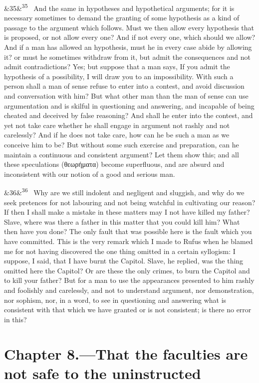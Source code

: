 \documentclass[12pt]{article}
\newcommand{\para}[1][]{\par\noindent\ifx&#1&\else\textsuperscript{\footnotesize #1}~\fi}
\begin{document}
\para[35] And the same in hypotheses and hypothetical arguments; for it is necessary sometimes to demand the granting of some hypothesis as a kind of passage to the argument which follows. Must we then allow every hypothesis that is proposed, or not allow every one? And if not every one, which should we allow? And if a man has allowed an hypothesis, must he in every case abide by allowing it? or must he sometimes withdraw from it, but admit the consequences and not admit contradictions? Yes; but suppose that a man says, If you admit the hypothesis of a possibility, I will draw you to an impossibility. With such a person shall a man of sense refuse to enter into a contest, and avoid discussion and conversation with him? But what other man than the man of sense can use argumentation and is skilful in questioning and answering, and incapable of being cheated and deceived by false reasoning? And shall he enter into the contest, and yet not take care whether he shall engage in argument not rashly and not carelessly? And if he does not take care, how can he be such a man as we conceive him to be? But without some such exercise and preparation, can he maintain a continuous and consistent argument? Let them show this; and all these speculations (θεωρήματα) become superfluous, and are absurd and inconsistent with our notion of a good and serious man.

\para[36] Why are we still indolent and negligent and sluggish, and why do we seek pretences for not labouring and not being watchful in cultivating our reason? If then I shall make a mistake in these matters may I not have killed my father? Slave, where was there a father in this matter that you could kill him? What then have you done? The only fault that was possible here is the fault which you have committed. This is the very remark which I made to Rufus when he blamed me for not having discovered the one thing omitted in a certain syllogism: I suppose, I said, that I have burnt the Capitol. Slave, he replied, was the thing omitted here the Capitol? Or are these the only crimes, to burn the Capitol and to kill your father? But for a man to use the appearances presented to him rashly and foolishly and carelessly, and not to understand argument, nor demonstration, nor sophism, nor, in a word, to see in questioning and answering what is consistent with that which we have granted or is not consistent; is there no error in this?

\section*{Chapter 8.---That the faculties are not safe to the uninstructed}
\end{document}
